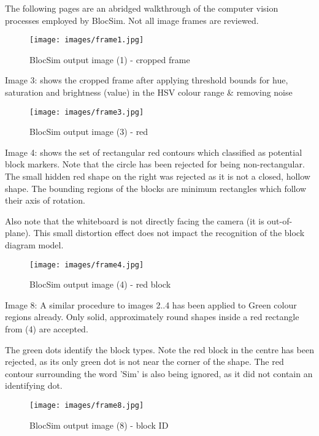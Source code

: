The following pages are an abridged walkthrough of the computer vision processes employed by BlocSim. Not all image frames are reviewed.

\begin{figure}[ht!]
\centering
\texttt{[image: images/frame1.jpg]}
\caption{BlocSim output image (1) - cropped frame \cite{blocsim}}
\label{im:frame1}
\end{figure}

\newpage
Image 3: shows the cropped frame after applying threshold bounds for hue, saturation and brightness (value) in the HSV colour range \& removing noise

\begin{figure}[ht!]
\centering
\texttt{[image: images/frame3.jpg]}
\caption{BlocSim output image (3) - red \cite{blocsim}}
\label{im:frame3}
\end{figure}

\newpage
Image 4: shows the set of rectangular red contours which classified as potential block markers. Note that the circle has been rejected for being non-rectangular. The small hidden red shape on the right was rejected as it is not a closed, hollow shape. The bounding regions of the blocks are minimum rectangles which follow their axis of rotation. 

Also note that the whiteboard is not directly facing the camera (it is out-of-plane). This small distortion effect does not impact the recognition of the block diagram model.

\begin{figure}[ht!]
\centering
\texttt{[image: images/frame4.jpg]}
\caption{BlocSim output image (4) - red block \cite{blocsim}}
\label{im:frame4}
\end{figure}

\newpage
Image 8: A similar procedure to images 2..4 has been applied to Green colour regions already. Only solid, approximately round shapes inside a red rectangle from (4) are accepted.

The green dots identify the block types. Note the red block in the centre has been rejected, as its only green dot is not near the corner of the shape. The red contour surrounding the word 'Sim' is also being ignored, as it did not contain an identifying dot.

\begin{figure}[ht!]
\centering
\texttt{[image: images/frame8.jpg]}
\caption{BlocSim output image (8) - block ID \cite{blocsim}}
\label{im:frame8}
\end{figure}

